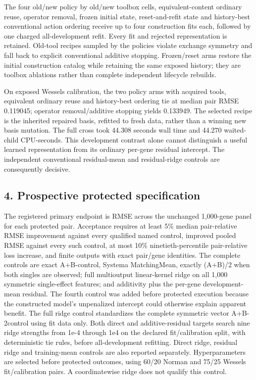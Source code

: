 \documentclass[
  10pt,
]{article}
\begin{document}
The four old/new policy by old/new toolbox cells, equivalent-content
ordinary reuse, operator removal, frozen initial state, reset-and-refit
state and history-best conventional action ordering receive up to four
construction fits each, followed by one charged all-development refit.
Every fit and rejected representation is retained. Old-tool recipes
sampled by the policies violate exchange symmetry and fall back to
explicit conventional additive stopping. Frozen/reset arms restore the
initial construction catalog while retaining the same exposed history;
they are toolbox ablations rather than complete independent lifecycle
rebuilds.

On exposed Wessels calibration, the two policy arms with acquired tools,
equivalent ordinary reuse and history-best ordering tie at median pair
RMSE 0.119045; operator removal/additive stopping yields 0.133949. The
selected recipe is the inherited repaired basis, refitted to fresh data,
rather than a winning new basis mutation. The full cross took 44.308
seconds wall time and 44.270 waited-child CPU-seconds. This development
contrast alone cannot distinguish a useful learned representation from
its ordinary per-gene residual intercept. The independent conventional
residual-mean and residual-ridge controls are consequently decisive.

\hypertarget{prospective-protected-specification}{%
\subsection{4. Prospective protected
specification}\label{prospective-protected-specification}}

The registered primary endpoint is RMSE across the unchanged 1,000-gene
panel for each protected pair. Acceptance requires at least 5\% median
pair-relative RMSE improvement against every qualified named control,
improved pooled RMSE against every such control, at most 10\%
ninetieth-percentile pair-relative loss increase, and finite outputs
with exact pair/gene identities. The complete controls are exact
A+B-control, Systema MatchingMean, exactly (A+B)/2 when both singles are
observed; full multioutput linear-kernel ridge on all 1,000 symmetric
single-effect features; and additivity plus the per-gene
development-mean residual. The fourth control was added before protected
execution because the constructed model's unpenalized intercept could
otherwise explain apparent benefit. The full ridge control standardizes
the complete symmetric vector A+B-2control using fit data only. Both
direct and additive-residual targets search nine ridge strengths from
1e-4 through 1e4 on the declared fit/calibration split, with
deterministic tie rules, before all-development refitting. Direct ridge,
residual ridge and training-mean controls are also reported separately.
Hyperparameters are selected before protected outcomes, using 60/20
Norman and 75/25 Wessels fit/calibration pairs. A coordinatewise ridge
does not qualify this control.
\end{document}
